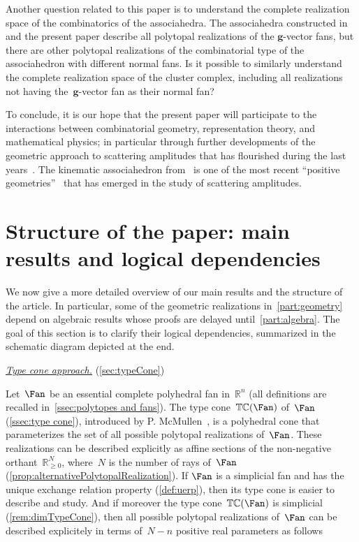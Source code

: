 \documentclass{amsart}
\theoremstyle{definition}
\newcommand{\R}{\mathbb{R}} %
\renewcommand{\b}[1]{{\boldsymbol{#1}}} %
\newcommand{\para}[1]{\medskip\noindent\uline{\textit{#1.}}} %
\newcommand{\typeCone}{\mathbb{TC}} %
\begin{document}
\smallskip
\noindent
Another question related to this paper is to understand the complete realization space of the combinatorics of the associahedra.
The associahedra constructed in~\cite{ArkaniHamedBaiHeYan, BazierMatteChapelierLaguetDouvilleMousavandThomasYildirim} and the present paper describe all polytopal realizations of the $\b{g}$-vector fans, but there are other polytopal realizations of the combinatorial type of the associahedron with different normal fans.
Is it possible to similarly understand the complete realization space of the cluster complex, including all realizations not having the~$\b{g}$-vector fan as their normal fan?

\medskip
\enlargethispage{.2cm}
To conclude, it is our hope that the present paper will participate to the interactions between combinatorial geometry, representation theory, and mathematical physics; in particular through further developments of the geometric approach to scattering amplitudes that has flourished during the last years~\cite{ArkaniHamedTrnka-Amplituhedron,ArkaniHamedBourjailyCachazoGoncharovPostnikovTrnka-GrassmannianGeometryScatteringAmplitudes}. The kinematic associahedron from~\cite{ArkaniHamedBaiHeYan} is one of the most recent ``positive geometries''~\cite{ArkaniHamedBaiLam-PositiveGeometries} that has emerged in the study of scattering amplitudes.


\section*{Structure of the paper: main results and logical dependencies}

We now give a more detailed overview of our main results and the structure of the article. In particular, some of the geometric realizations in~\cref{part:geometry} depend on algebraic results whose proofs are delayed until~\cref{part:algebra}. The goal of this section is to clarify their logical dependencies, summarized in the schematic diagram depicted at the end. 

\para{Type cone approach}
(\cref{sec:typeCone})

\noindent
Let~$\Fan$ be an essential complete polyhedral fan in~$\R^n$ (all definitions are recalled in~\cref{ssec:polytopes and fans}).
The type cone~$\typeCone(\Fan)$ of~$\Fan$ (\cref{ssec:type cone}), introduced by P. McMullen~\cite{McMullen-typeCone}, is a polyhedral cone that parameterizes the set of all possible polytopal realizations of~$\Fan$. These realizations can be described explicitly as affine sections of the non-negative orthant~$\R^N_{\geq0}$, where~$N$ is the number of rays of~$\Fan$ (\cref{prop:alternativePolytopalRealization}).  
If $\Fan$ is a simplicial fan and has the unique exchange relation property (\cref{def:uerp}), then its type cone is easier to describe and study.
And if moreover the type cone~$\typeCone(\Fan)$ is simplicial (\cref{rem:dimTypeCone}), then all possible polytopal realizations of~$\Fan$ can be described explicitely in terms of~$N-n$ positive real parameters as follows
\end{document}
